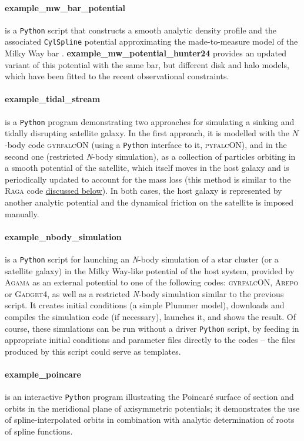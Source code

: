 \documentclass[12pt]{article}
\newcommand{\Agama}{\textsc{Agama}\xspace}
\newcommand{\Nbody}{\textsl{N}-body\xspace}
\newcommand{\Python}{\texttt{Python}\xspace}
\newcommand{\ppp}[1]{\textcolor{darkolive} {\texttt{#1}}}
\let\oldparagraph\paragraph
\renewcommand{\paragraph}[1]{\vspace{-2mm}\oldparagraph{#1}}
\begin{document}
\paragraph{example_mw_bar_potential} is a \Python script that constructs a smooth analytic density profile \cite{Sormani2022b} and the associated \ppp{CylSpline} potential approximating the made-to-measure model of the Milky Way bar \cite{Portail2017}.
\textbf{example_mw_potential_hunter24} provides an updated variant of this potential \cite{Hunter2024} with the same bar, but different disk and halo models, which have been fitted to the recent observational constraints.

\paragraph{example_tidal_stream} is a \Python program demonstrating two approaches for simulating a sinking and tidally disrupting satellite galaxy. In the first approach, it is modelled with the $N$-body code \textsc{gyrfalcON} (using a \Python interface to it, \textsc{pyfalcON}), and in the second one (restricted \Nbody simulation), as a collection of particles orbiting in a smooth potential of the satellite, which itself moves in the host galaxy and is periodically updated to account for the mass loss (this method is similar to the \textsc{Raga} code \hyperref[sec:raga]{discussed below}). In both cases, the host galaxy is represented by another analytic potential and the dynamical friction on the satellite is imposed manually.

\paragraph{example_nbody_simulation} is a \Python script for launching an \Nbody simulation of a star cluster (or a satellite galaxy) in the Milky Way-like potential of the host system, provided by \Agama as an external potential to one of the following codes: \textsc{gyrfalcON}, \textsc{Arepo} or \textsc{Gadget4}, as well as a restricted \Nbody simulation similar to the previous script. It creates initial conditions (a simple Plummer model), downloads and compiles the simulation code (if necessary), launches it, and shows the result. Of course, these simulations can be run without a driver \Python script, by feeding in appropriate initial conditions and parameter files directly to the codes -- the files produced by this script could serve as templates.

\paragraph{example_poincare} is an interactive \Python program illustrating the Poincar\'e surface of section and orbits in the meridional plane of axisymmetric potentials; it demonstrates the use of spline-interpolated orbits in combination with analytic determination of roots of spline functions.
\end{document}
